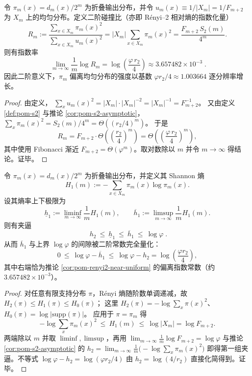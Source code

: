 \begin{corollary}\label{cor:pom-renyi2-near-uniform}
令 \(\pi_m(x)=d_m(x)/2^m\) 为折叠输出分布，并令 \(u_m(x)\equiv 1/|X_m|=1/F_{m+2}\) 为 \(X_m\) 上的均匀分布。定义二阶碰撞比（亦即 Rényi--2 相对熵的指数化量）
\[
R_m
:=\frac{\sum_{x\in X_m}\pi_m(x)^2}{\sum_{x\in X_m}u_m(x)^2}
=|X_m|\sum_{x\in X_m}\pi_m(x)^2
=\frac{F_{m+2}\,S_2(m)}{4^m}.
\]
则有指数率
\[
\boxed{\;
\lim_{m\to\infty}\frac{1}{m}\log R_m
=\log\!\left(\frac{\varphi\,r_2}{4}\right)
\approx 3.657482\times 10^{-3}\; }.
\]
因此二阶意义下，\(\pi_m\) 偏离均匀分布的强度以基数 \(\varphi r_2/4\approx 1.003664\) 逐分辨率增长。
\end{corollary}
\begin{proof}
由定义，
\(
\sum_x u_m(x)^2=|X_m|\cdot |X_m|^{-2}=|X_m|^{-1}=F_{m+2}^{-1}
\)。
又由定义 \ref{def:pom-s2} 与推论 \ref{cor:pom-s2-asymptotic}，
\(
\sum_x\pi_m(x)^2=S_2(m)/4^m=\Theta((r_2/4)^m)
\)。
于是
\[
R_m=F_{m+2}\cdot \Theta\!\left(\left(\frac{r_2}{4}\right)^m\right)
=\Theta\!\left(\left(\frac{\varphi\,r_2}{4}\right)^m\right),
\]
其中使用 Fibonacci 渐近 \(F_{m+2}=\Theta(\varphi^m)\)。取对数除以 \(m\) 并令 \(m\to\infty\) 得结论。证毕。
\end{proof}

\begin{corollary}[熵谱夹逼：\texorpdfstring{$h_2\le h_1\le \log\varphi$}{h2<=h1<=log phi}]\label{cor:pom-shannon-entropy-squeeze}
令 \(\pi_m(x)=d_m(x)/2^m\) 为折叠输出分布，并定义其 Shannon 熵
\[
H_1(m):=-\sum_{x\in X_m}\pi_m(x)\log\pi_m(x).
\]
设其熵率上下极限为
\[
\underline h_1:=\liminf_{m\to\infty}\frac{1}{m}H_1(m),
\qquad
\overline h_1:=\limsup_{m\to\infty}\frac{1}{m}H_1(m).
\]
则有夹逼
\[
\boxed{\;
h_2\ \le\ \underline h_1\ \le\ \overline h_1\ \le\ \log\varphi\; }.
\]
从而 \(\overline h_1\) 与上界 \(\log\varphi\) 的间隙被二阶常数完全量化：
\[
0\ \le\ \log\varphi-\overline h_1\ \le\ \log\varphi-h_2
=\log\!\left(\frac{\varphi r_2}{4}\right),
\]
其中右端恰为推论 \ref{cor:pom-renyi2-near-uniform} 的偏离指数常数（约 \(3.657482\times 10^{-3}\)）。
\end{corollary}
\begin{proof}
对任意有限支持分布 \(\pi\)，Rényi 熵随阶数单调递减，故 \(H_2(\pi)\le H_1(\pi)\le H_0(\pi)\)；
这里 \(H_2(\pi)=-\log\sum_x\pi(x)^2\)、\(H_0(\pi)=\log|\mathrm{supp}(\pi)|\)。
应用于 \(\pi=\pi_m\) 得
\[
-\log\sum_x\pi_m(x)^2\ \le\ H_1(m)\ \le\ \log|X_m|=\log F_{m+2}.
\]
两端除以 \(m\) 并取 \(\liminf,\limsup\)，再用 \(\lim_{m\to\infty}\frac{1}{m}\log F_{m+2}=\log\varphi\) 与推论 \ref{cor:pom-s2-asymptotic} 的
\(
h_2=\lim_{m\to\infty}\frac{1}{m}\bigl(-\log\sum_x\pi_m(x)^2\bigr)
\)
即得第一组夹逼。不等式 \(\log\varphi-h_2=\log(\varphi r_2/4)\) 由 \(h_2=\log(4/r_2)\) 直接化简得到。证毕。
\end{proof}

